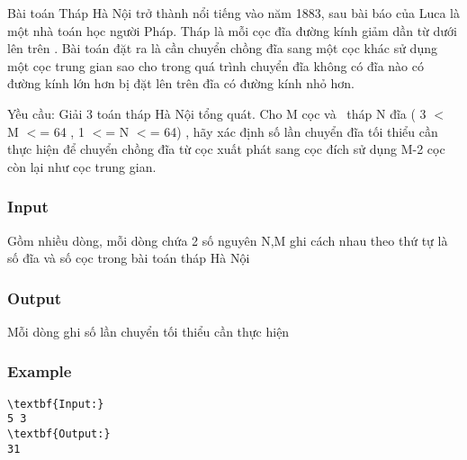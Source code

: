 



   Bài toán Tháp Hà Nội trở thành nổi tiếng vào năm 1883, sau bài báo của Luca là một nhà toán học người Pháp. Tháp là mỗi cọc đĩa đường kính giảm dần từ dưới lên trên . Bài toán đặt ra là cần chuyển chồng đĩa sang một cọc khác sử dụng một cọc trung gian sao cho trong quá trình chuyển đĩa không có đĩa nào có đường kính lớn hơn bị đặt lên trên đĩa có đường kính nhỏ hơn.  

   Yều cầu: Giải 3 toán tháp Hà Nội tổng quát. Cho M cọc và  tháp N đĩa ( 3 $<$ M $<$= 64 , 1 $<$= N $<$= 64) , hãy xác định số lần chuyển đĩa tối thiểu cần thực hiện để chuyển chồng đĩa từ cọc xuất phát sang cọc đích sử dụng M-2 cọc còn lại như cọc trung gian.  

\subsubsection{   Input  }

   Gồm nhiều dòng, mỗi dòng chứa 2 số nguyên N,M ghi cách nhau theo thứ tự là số đĩa và số cọc trong bài toán tháp Hà Nội  

\subsubsection{   Output  }

   Mỗi dòng ghi số lần chuyển tối thiểu cần thực hiện  

\subsubsection{   Example  }
\begin{verbatim}
\textbf{Input:}
5 3
\textbf{Output:}
31\end{verbatim}